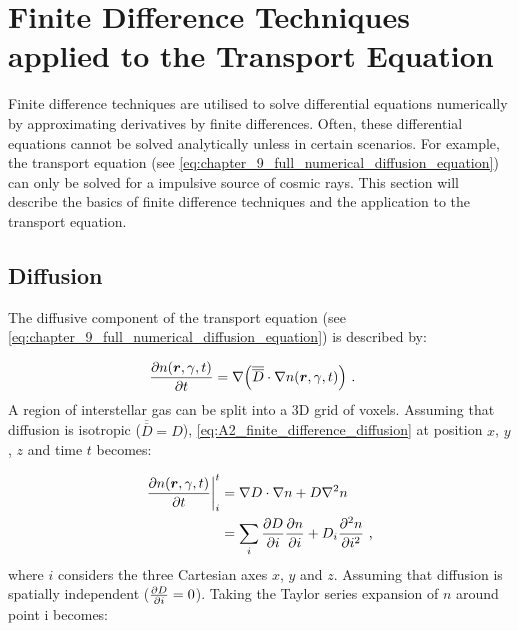 \chapter{Finite Difference Techniques applied to the Transport Equation} \label{sec:A2_finite_difference}

Finite difference techniques are utilised to solve differential equations numerically by approximating derivatives by finite differences. Often, these differential equations cannot be solved analytically unless in certain scenarios. For example, the transport equation (see \autoref{eq:chapter_9_full_numerical_diffusion_equation}) can only be solved for a impulsive source of cosmic rays. This section will describe the basics of finite difference techniques and the application to the transport equation.

\section{Diffusion} \label{sec:A2_diffusion}

The diffusive component of the transport equation (see \autoref{eq:chapter_9_full_numerical_diffusion_equation}) is described by:

\begin{equation}
    \begin{aligned}
    \pdv{n\qty(\boldsymbol{r},\gamma,t)}{t}&=\nabla \qty(\overline{\overline{D}}\cdot\nabla n\qty(\boldsymbol{r},\gamma,t))\text{ .} 
    \end{aligned} \label{eq:A2_finite_difference_diffusion}
\end{equation}
\noindent A region of interstellar gas can be split into a 3D grid of voxels. Assuming that diffusion is isotropic ($\overline{\overline{D}}=D$), \autoref{eq:A2_finite_difference_diffusion} at position $x$, $y$, $z$ and time $t$ becomes:

\begin{equation}
    \begin{aligned}
    \pdv{n\qty(\boldsymbol{r},\gamma,t)}{t}\bigg|_{i}^t &= \nabla D\cdot\nabla n + D\nabla^2 n \\
    &= \sum_{i} \pdv{D}{i}\pdv{n}{i}+ D_i\pdv[2]{n}{i}\text{ ,} 
    \end{aligned} \label{eq:A2_finite_difference_diffusion_expanded}
\end{equation}
\noindent where $i$ considers the three Cartesian axes $x$, $y$ and $z$. Assuming that diffusion is spatially independent ($\pdv{D}{i}=0$). Taking the Taylor series expansion of $n$ around point i becomes:

